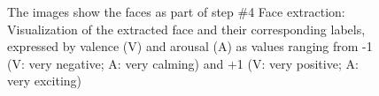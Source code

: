 \begin{figure}[htbp]
  \hfill
  \caption[ER pipeline step \#4: Face extraction]{The images show the faces as part of step \#4 Face extraction: Visualization of the extracted face and their corresponding labels, expressed by valence (V) and arousal (A) as values ranging from -1 (V: very negative; A: very calming) and +1 (V: very positive; A: very exciting)}
  \label{fig:MethodologyExtraction}
\end{figure}


